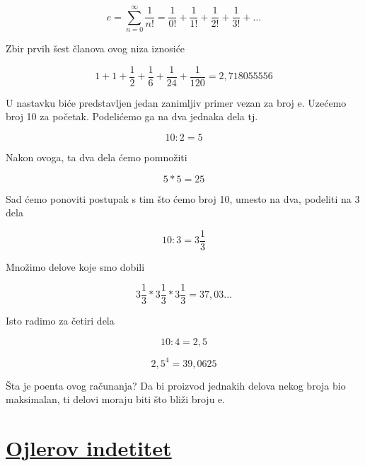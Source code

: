 \documentclass{article}
\begin{document}
	\[ e= \sum_{n=0}^{\infty} \frac{1}{n!} = \frac{1}{0!} + \frac{1}{1!} + \frac{1}{2!} + \frac{1}{3!} + ... \]
	\vspace{5mm}
	
	Zbir prvih šest članova ovog niza iznosiće
	
	\[ 1 + 1 + \frac{1}{2} + \frac{1}{6} + \frac{1}{24} + \frac{1}{120} = 2,718055556 \]
	\vspace{5mm}
	
	U nastavku biće predstavljen jedan zanimljiv primer vezan za broj e. Uzećemo broj 10 za početak. Podelićemo ga na dva jednaka dela tj.
	
	\[ 10 : 2 = 5 \]
	\vspace{5mm}
	
	Nakon ovoga, ta dva dela ćemo pomnožiti
	
	\[ 5 * 5 = 25 \]
	\vspace{5mm}
	
	Sad ćemo ponoviti postupak s tim što ćemo broj 10, umesto na dva, podeliti na 3 dela
	
	\[ 10 : 3 = 3\frac{1}{3} \]
	\vspace{5mm}
	
	Množimo delove koje smo dobili
	
	\[  3\frac{1}{3} *  3\frac{1}{3} *  3\frac{1}{3} = 37,03... \]
	\vspace{5mm}
	
	Isto radimo za četiri dela
	
	\[ 10 : 4 = 2,5 \]
	
	\[ 2,5^4 = 39,0625\]
	\vspace{5mm} 
	
	Šta je poenta ovog računanja? Da bi proizvod jednakih delova nekog broja bio maksimalan, ti delovi moraju biti što bliži broju e.
	\section*{\uline{Ojlerov indetitet}}
\paragraph{}
\paragraph{}
\end{document}
